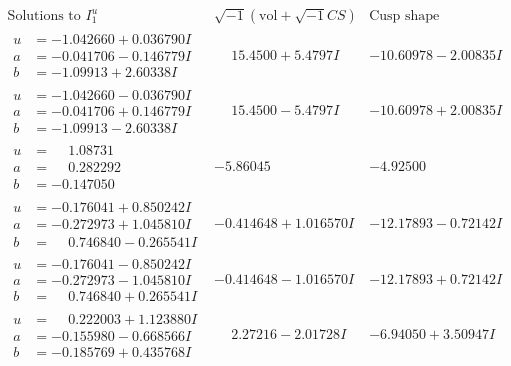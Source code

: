 \documentclass[1p]{elsarticle_modified}
\theoremstyle{definition}
\newcommand{\I}{\sqrt{-1}}
\begin{document}
$$\begin{array}{c|c|c}  
\text{Solutions to }I^u_{1}& \I (\text{vol} + \sqrt{-1}CS) & \text{Cusp shape}\\
 \hline 
\begin{aligned}
u &= -1.042660 + 0.036790 I \\
a &= -0.041706 - 0.146779 I \\
b &= -1.09913 + 2.60338 I\end{aligned}
 & \phantom{-}15.4500 + 5.4797 I & -10.60978 - 2.00835 I \\ \hline\begin{aligned}
u &= -1.042660 - 0.036790 I \\
a &= -0.041706 + 0.146779 I \\
b &= -1.09913 - 2.60338 I\end{aligned}
 & \phantom{-}15.4500 - 5.4797 I & -10.60978 + 2.00835 I \\ \hline\begin{aligned}
u &= \phantom{-}1.08731\phantom{ +0.000000I} \\
a &= \phantom{-}0.282292\phantom{ +0.000000I} \\
b &= -0.147050\phantom{ +0.000000I}\end{aligned}
 & -5.86045\phantom{ +0.000000I} & -4.92500\phantom{ +0.000000I} \\ \hline\begin{aligned}
u &= -0.176041 + 0.850242 I \\
a &= -0.272973 + 1.045810 I \\
b &= \phantom{-}0.746840 - 0.265541 I\end{aligned}
 & -0.414648 + 1.016570 I & -12.17893 - 0.72142 I \\ \hline\begin{aligned}
u &= -0.176041 - 0.850242 I \\
a &= -0.272973 - 1.045810 I \\
b &= \phantom{-}0.746840 + 0.265541 I\end{aligned}
 & -0.414648 - 1.016570 I & -12.17893 + 0.72142 I \\ \hline\begin{aligned}
u &= \phantom{-}0.222003 + 1.123880 I \\
a &= -0.155980 - 0.668566 I \\
b &= -0.185769 + 0.435768 I\end{aligned}
 & \phantom{-}2.27216 - 2.01728 I & -6.94050 + 3.50947 I \\ \hline\begin{aligned}

\end{aligned}
\end{array}$$
\end{document}
